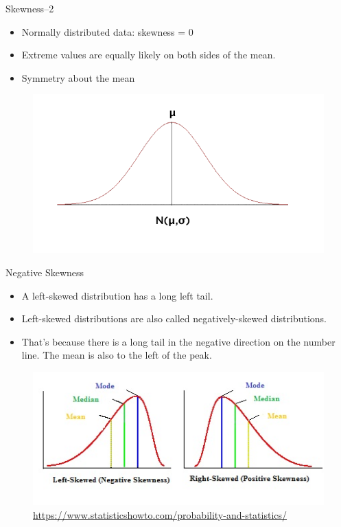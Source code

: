 \documentclass[10pt,dvipsnames, aspectratio=169]{beamer}
\begin{document}
\begin{frame}[t]{Skewness--2}
	\begin{itemize}
		\item Normally distributed data: skewness = 0
		\item Extreme values are equally likely on both
		sides of the mean.
		\item Symmetry about the mean
	\end{itemize}
	\begin{figure} [ht]
		\centering
		\includegraphics[trim={0 1cm 0 0}, clip, scale=0.4]{eda/nd3.png}
	\end{figure}
\end{frame}
\begin{frame}[t]{Negative Skewness}
	\begin{itemize}
		\item A left-skewed distribution has a long left tail.
		\item Left-skewed distributions are also called negatively-skewed 
		distributions.
		\item That’s because there is a long tail in the negative direction on 
		the number line. The mean is also to the left of the peak.
	\end{itemize}
	
	\begin{figure} [ht]
		\centering
		\includegraphics[trim={0 0 6cm 0}, clip, 
		scale=0.7]{eda/pearson-mode-skewness.jpg}
		\caption{\url{https://www.statisticshowto.com/probability-and-statistics/}}
	\end{figure}
\end{frame}
\end{document}
